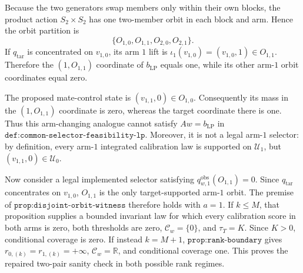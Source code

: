 Because the two generators swap members only within their own blocks, the product action \(S_2\times S_2\) has one two-member orbit in each block and arm. Hence the orbit partition is \[\{O_{1,0},O_{1,1},O_{2,0},O_{2,1}\}.\] If \(q_{\mathrm{tar}}\) is concentrated on \(v_{1,0}\), its arm \(1\) lift is \(\iota_1(v_{1,0})=(v_{1,0},1)\in O_{1,1}\). Therefore the \((1,O_{1,1})\) coordinate of \(b_{\mathrm{LP}}\) equals one, while its other arm-\(1\) orbit coordinates equal zero.

The proposed mate-control state is \((v_{1,1},0)\in O_{1,0}\). Consequently its mass in the \((1,O_{1,1})\) coordinate is zero, whereas the target coordinate there is one. Thus this arm-changing analogue cannot satisfy \(Aw=b_{\mathrm{LP}}\) in \(\texttt{def:common-selector-feasibility-lp}\). Moreover, it is not a legal arm-\(1\) selector: by definition, every arm-\(1\) integrated calibration law is supported on \(\mathcal U_1\), but \((v_{1,1},0)\in\mathcal U_0\).

Now consider a legal implemented selector satisfying \(q^{\mathrm{obs}}_{w,1}(O_{1,1})=0\). Since \(q_{\mathrm{tar}}\) concentrates on \(v_{1,0}\), \(O_{1,1}\) is the only target-supported arm-\(1\) orbit. The premise of \(\texttt{prop:disjoint-orbit-witness}\) therefore holds with \(a=1\). If \(k\le M\), that proposition supplies a bounded invariant law for which every calibration score in both arms is zero, both thresholds are zero, \(\mathcal C_w=\{0\}\), and \(\tau_T=K\). Since \(K>0\), conditional coverage is zero. If instead \(k=M+1\), \(\texttt{prop:rank-boundary}\) gives \(r_{0,(k)}=r_{1,(k)}=+\infty\), \(\mathcal C_w=\mathbb R\), and conditional coverage one. This proves the repaired two-pair sanity check in both possible rank regimes.